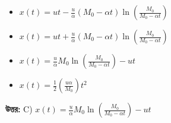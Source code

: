\documentclass[12pt, a4paper]{article}
\begin{document}
\begin{itemize}[label={}, leftmargin=1cm, itemsep=0.5em]
    \item[\textbf{A)}] $x(t) = u t - \frac{u}{\alpha} (M_0 - \alpha t) \ln\left(\frac{M_0}{M_0 - \alpha t}\right)$
    \item[\textbf{B)}] $x(t) = u t + \frac{u}{\alpha} (M_0 - \alpha t) \ln\left(\frac{M_0}{M_0 - \alpha t}\right)$
    \item[\textbf{C)}] $x(t) = \frac{u}{\alpha} M_0 \ln\left(\frac{M_0}{M_0 - \alpha t}\right) - u t$
    \item[\textbf{D)}] $x(t) = \frac{1}{2} \left(\frac{u \alpha}{M_0}\right) t^2$
\end{itemize}

\vspace{0.5em}
\begin{tcolorbox}[answerbox]
    \textbf{\color{success} উত্তর:} C) $x(t) = \frac{u}{\alpha} M_0 \ln\left(\frac{M_0}{M_0 - \alpha t}\right) - u t$
\end{tcolorbox}
\vspace{1em}
\end{document}
